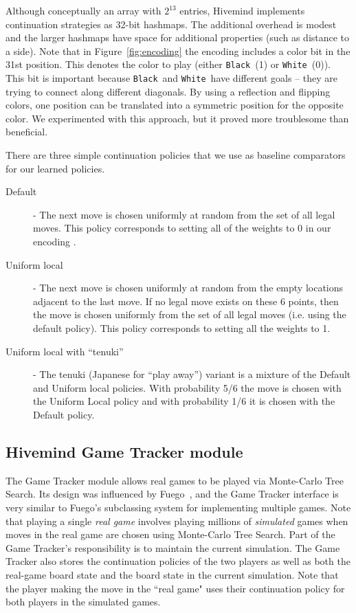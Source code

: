 \documentclass{acm_proc_article-sp}
\newcommand{\hblack}{\texttt{Black}}
\newcommand{\hwhite}{\texttt{White}}
\begin{document}
Although conceptually an array with $2^{13}$ entries, Hivemind implements continuation strategies as
32-bit hashmaps.  
The additional overhead is modest and the larger hashmaps  have space for additional properties (such as distance to a side).
Note that in Figure~\ref{fig:encoding} the encoding includes a color bit in the 31st position. This denotes the color to play (either \hblack\ (1) or \hwhite\ (0)). 
This bit is important because \hblack\ and \hwhite\ have different goals -- they are trying to connect along different diagonals. 
By using a reflection and flipping colors, one position can be translated into a symmetric  position for the opposite color. 
We experimented with this approach, but it proved more troublesome than beneficial.

There are three simple continuation policies that we use as baseline comparators for our learned policies.

\begin{description}
	\item[Default] - The next move is chosen uniformly at random from the set of all legal moves.
	This policy corresponds to setting all of the weights to 0 in our encoding .
	\item[Uniform local] - The next move is chosen uniformly at random from the empty locations adjacent to the last move.
	If no legal move exists on these 6 points, then the move is chosen uniformly from the set of all legal moves 
	(i.e. using the default policy).  This policy corresponds to setting all the weights to 1.
	\item[Uniform local with ``tenuki''] - The tenuki (Japanese for  ``play away'') variant is a mixture of the Default and Uniform local policies.  
	With probability 5/6 the move is chosen with the Uniform Local policy and with probability 1/6 it is chosen with the Default policy. 
\end{description}


\subsection{Hivemind Game Tracker module}
\label{s:tracker}

The Game Tracker module allows real games to be played via Monte-Carlo Tree Search.
Its design was influenced by Fuego~\cite{Fuego},  and the Game Tracker interface is very similar to Fuego's subclassing system for implementing multiple games.
Note that playing a single \emph{real game} involves playing millions of  \emph{simulated} games when
moves in the real game are chosen using Monte-Carlo Tree Search.
Part of the Game Tracker's responsibility is to maintain the 
current simulation.
The Game Tracker also stores the continuation policies of the two players as well as both
the real-game board state and the board state in the current simulation.
Note that the player making the move in the ``real game" uses their continuation policy for both players in the simulated games.
\end{document}
